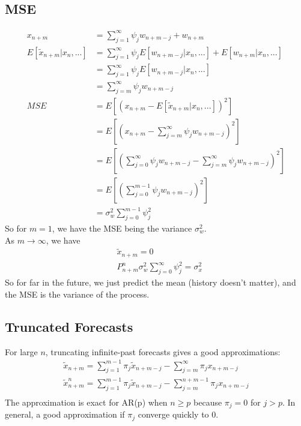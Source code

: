 \subsection{MSE} 
    \begin{align*}
        x_{n+m} 
        & = \sum_{j=1}^\infty \psi_j w_{n+m-j} + w_{n+m}\\
        E[\tilde{x}_{n+m}| x_n, ...]
        & = \sum_{j=1}^\infty \psi_j E[w_{n+m-j} | x_n, ...] +E[w_{n+m}|x_n,...]\\
        & = \sum_{j=1}^\infty \psi_j E[w_{n+m-j} | x_n, ...]\\
        & = \sum_{j=m}^\infty \psi_j w_{n+m-j}\\
        MSE 
        & = E[(x_{n+m} - E[\tilde{x}_{n+m}|x_n,...])^2] \\
        & = E[(x_{n+m} - \sum_{j=m}^\infty \psi_j w_{n+m-j})^2] \\
        & = E[(\sum_{j=0}^\infty \psi_j w_{n+m-j} - \sum_{j=m}^\infty \psi_j w_{n+m-j})^2] \\
        & = E[(\sum_{j=0}^{m-1} \psi_j w_{n+m-j})^2]\\
        & = \sigma_w^2 \sum_{j=0}^{m-1} \psi_j^2
    \end{align*}
So for $m = 1$, we have the MSE being the variance $\sigma_w^2$. \\
As $m \to \infty$, we have 
    \begin{align*}
        & \tilde{x}_{n+m} = 0 \tag{The mean} \\
        & P_{n+m}^n \sigma_w^2 \sum_{j=0}^\infty \psi_j^2 = \sigma_x^2
    \end{align*}
So for far in the future, we just predict the mean (history doesn't matter), and the MSE is the variance of the process. 

\subsection{Truncated Forecasts}
For large $n$, truncating infinite-past forecasts gives a good approximations: 
    \begin{align*}
        \tilde{x}_{n+m} = \sum_{j=1}^{m-1} \pi_j \tilde{x}_{n+m-j} - \sum_{j=m}^\infty \pi_j x_{n+m-j}\\
        \tilde{x}^n_{n+m} = \sum_{j=1}^{m-1} \pi_j \tilde{x}_{n+m-j} - \sum_{j=m}^{n+m-1} \pi_j x_{n+m-j}\\
    \end{align*}
The approximation is exact for AR(p) when $n \geq p$ because $\pi_j = 0$ for $j > p$. In general, a good approximation if $\pi_j$ converge quickly to 0. 


